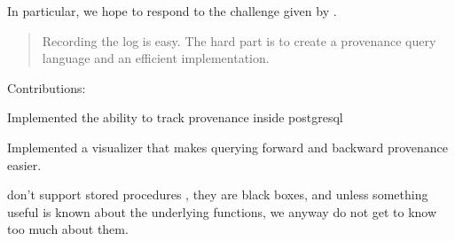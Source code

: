 In particular, we hope to respond to the challenge given by \cite{cudré2009demonstration}.

\begin{quote}
Recording the log is easy. The hard part is to create a provenance query language and an efficient implementation.  
\end{quote}

Contributions:

Implemented the ability to track provenance inside postgresql

Implemented a visualizer that makes querying forward and backward provenance easier.

don't support stored procedures , they are black boxes, and unless something useful is known about the underlying functions, we anyway do not get to know too much about them.
